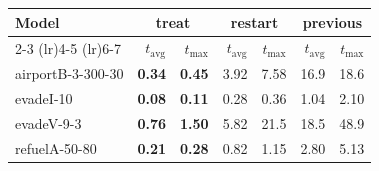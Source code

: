 \begin{tabular}{lrrrrrr}
\toprule
\multirow{2}{*}{Model} & \multicolumn{2}{c}{treat} & \multicolumn{2}{c}{restart} & \multicolumn{2}{c}{previous} \\
    \cmidrule(lr){2-3} \cmidrule(lr){4-5} \cmidrule(lr){6-7}
 & $t_\text{avg}$ & $t_\text{max}$ & $t_\text{avg}$ & $t_\text{max}$ & $t_\text{avg}$ & $t_\text{max}$ \\
\midrule
airportB-3-300-30 & \textbf{0.34} & \textbf{0.45} & 3.92 & 7.58 & 16.9 & 18.6 \\
evadeI-10 & \textbf{0.08} & \textbf{0.11} & 0.28 & 0.36 & 1.04 & 2.10 \\
evadeV-9-3 & \textbf{0.76} & \textbf{1.50} & 5.82 & 21.5 & 18.5 & 48.9 \\
refuelA-50-80 & \textbf{0.21} & \textbf{0.28} & 0.82 & 1.15 & 2.80 & 5.13 \\
\bottomrule
\end{tabular}
